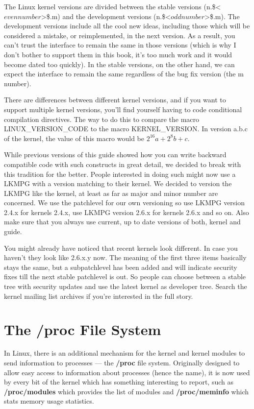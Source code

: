 \documentclass[10pt, oneside]{book}
\begin{document}
The Linux kernel versions are divided between the stable versions (n.\$<\(even number\)>\$.m) and the development versions (n.\$<\(odd number\)>\$.m). The development versions include all the cool new ideas, including those which will be considered a mistake, or reimplemented, in the next version. As a result, you can't trust the interface to remain the same in those versions (which is why I don't bother to support them in this book, it's too much work and it would become dated too quickly). In the stable versions, on the other hand, we can expect the interface to remain the same regardless of the bug fix version (the m number).

There are differences between different kernel versions, and if you want to support multiple kernel versions, you'll find yourself having to code conditional compilation directives. The way to do this to compare the macro LINUX\_VERSION\_CODE to the macro KERNEL\_VERSION. In version a.b.c of the kernel, the value of this macro would be \(2^{16}a+2^{8}b+c\).

While previous versions of this guide showed how you can write backward compatible code with such constructs in great detail, we decided to break with this tradition for the better. People interested in doing such might now use a LKMPG with a version matching to their kernel. We decided to version the LKMPG like the kernel, at least as far as major and minor number are concerned. We use the patchlevel for our own versioning so use LKMPG version 2.4.x for kernels 2.4.x, use LKMPG version 2.6.x for kernels 2.6.x and so on. Also make sure that you always use current, up to date versions of both, kernel and guide.

You might already have noticed that recent kernels look different. In case you haven't they look like 2.6.x.y now. The meaning of the first three items basically stays the same, but a subpatchlevel has been added and will indicate security fixes till the next stable patchlevel is out. So people can choose between a stable tree with security updates and use the latest kernel as developer tree. Search the kernel mailing list archives if you're interested in the full story.

\section{The /proc File System}
\label{sec:orgc6c4625}
In Linux, there is an additional mechanism for the kernel and kernel modules to send information to processes --- the \textbf{/proc} file system. Originally designed to allow easy access to information about processes (hence the name), it is now used by every bit of the kernel which has something interesting to report, such as \textbf{/proc/modules} which provides the list of modules and \textbf{/proc/meminfo} which stats memory usage statistics.
\end{document}
